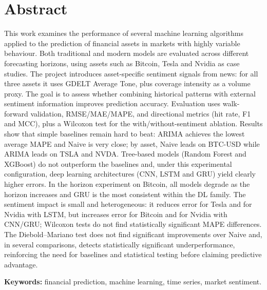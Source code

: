 \chapter*{Abstract}
This work examines the performance of several machine learning algorithms applied to the prediction of financial assets in markets with highly variable behaviour. Both traditional and modern models are evaluated across different forecasting horizons, using assets such as Bitcoin, Tesla and Nvidia as case studies. The project introduces asset-specific sentiment signals from news: for all three assets it uses GDELT Average Tone, plus coverage intensity as a volume proxy. The goal is to assess whether combining historical patterns with external sentiment information improves prediction accuracy. Evaluation uses walk-forward validation, RMSE/MAE/MAPE, and directional metrics (hit rate, F1 and MCC), plus a Wilcoxon test for the with/without-sentiment ablation. Results show that simple baselines remain hard to beat: ARIMA achieves the lowest average MAPE and Naive is very close; by asset, Naive leads on BTC-USD while ARIMA leads on TSLA and NVDA. Tree-based models (Random Forest and XGBoost) do not outperform the baselines and, under this experimental configuration, deep learning architectures (CNN, LSTM and GRU) yield clearly higher errors. In the horizon experiment on Bitcoin, all models degrade as the horizon increases and GRU is the most consistent within the DL family. The sentiment impact is small and heterogeneous: it reduces error for Tesla and for Nvidia with LSTM, but increases error for Bitcoin and for Nvidia with CNN/GRU; Wilcoxon tests do not find statistically significant MAPE differences. The Diebold--Mariano test does not find significant improvements over Naive and, in several comparisons, detects statistically significant underperformance, reinforcing the need for baselines and statistical testing before claiming predictive advantage.

\vspace{0.5cm}

\textbf{Keywords:} financial prediction, machine learning, time series, market sentiment.
